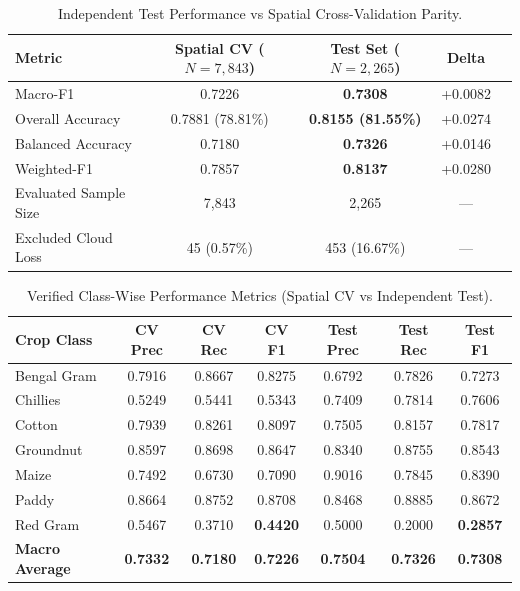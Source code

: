 \documentclass[runningheads]{llncs}
\begin{document}
\begin{table}[t]
\centering
\caption{Independent Test Performance vs Spatial Cross-Validation Parity.}
\label{tab:test}
\small
\begin{tabular}{lcccc}
\toprule
\textbf{Metric} & \textbf{Spatial CV ($N=7,843$)} & \textbf{Test Set ($N=2,265$)} & \textbf{Delta} \\
\midrule
Macro-F1 & 0.7226 & \textbf{0.7308} & +0.0082 \\
Overall Accuracy & 0.7881 (78.81\%) & \textbf{0.8155 (81.55\%)} & +0.0274 \\
Balanced Accuracy & 0.7180 & \textbf{0.7326} & +0.0146 \\
Weighted-F1 & 0.7857 & \textbf{0.8137} & +0.0280 \\
Evaluated Sample Size & 7,843 & 2,265 & — \\
Excluded Cloud Loss & 45 (0.57\%) & 453 (16.67\%) & — \\
\bottomrule
\end{tabular}
\end{table}

\begin{table}[t]
\centering
\caption{Verified Class-Wise Performance Metrics (Spatial CV vs Independent Test).}
\label{tab:classwise}
\small
\begin{tabular}{lcccccc}
\toprule
\textbf{Crop Class} & \textbf{CV Prec} & \textbf{CV Rec} & \textbf{CV F1} & \textbf{Test Prec} & \textbf{Test Rec} & \textbf{Test F1} \\
\midrule
Bengal Gram & 0.7916 & 0.8667 & 0.8275 & 0.6792 & 0.7826 & 0.7273 \\
Chillies & 0.5249 & 0.5441 & 0.5343 & 0.7409 & 0.7814 & 0.7606 \\
Cotton & 0.7939 & 0.8261 & 0.8097 & 0.7505 & 0.8157 & 0.7817 \\
Groundnut & 0.8597 & 0.8698 & 0.8647 & 0.8340 & 0.8755 & 0.8543 \\
Maize & 0.7492 & 0.6730 & 0.7090 & 0.9016 & 0.7845 & 0.8390 \\
Paddy & 0.8664 & 0.8752 & 0.8708 & 0.8468 & 0.8885 & 0.8672 \\
Red Gram & 0.5467 & 0.3710 & \textbf{0.4420} & 0.5000 & 0.2000 & \textbf{0.2857} \\
\midrule
\textbf{Macro Average} & \textbf{0.7332} & \textbf{0.7180} & \textbf{0.7226} & \textbf{0.7504} & \textbf{0.7326} & \textbf{0.7308} \\
\bottomrule
\end{tabular}
\end{table}
\end{document}
